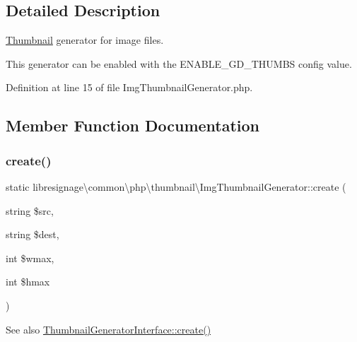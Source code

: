 \subsection{Detailed Description}
\hyperlink{classlibresignage_1_1common_1_1php_1_1thumbnail_1_1Thumbnail}{Thumbnail} generator for image files.


\begin{DoxyItemize}
\item This generator can be enabled with the E\+N\+A\+B\+L\+E\+\_\+\+G\+D\+\_\+\+T\+H\+U\+M\+BS config value. 
\end{DoxyItemize}

Definition at line 15 of file Img\+Thumbnail\+Generator.\+php.



\subsection{Member Function Documentation}
\mbox{\label{classlibresignage_1_1common_1_1php_1_1thumbnail_1_1ImgThumbnailGenerator_aa988f6ec383e43ddf2d1c017e1a0af4f}} 
\subsubsection{\texorpdfstring{create()}{create()}}
{\footnotesize\ttfamily static libresignage\textbackslash{}common\textbackslash{}php\textbackslash{}thumbnail\textbackslash{}\+Img\+Thumbnail\+Generator\+::create (\begin{DoxyParamCaption}\item[{string}]{\$src,  }\item[{string}]{\$dest,  }\item[{int}]{\$wmax,  }\item[{int}]{\$hmax }\end{DoxyParamCaption})\hspace{0.3cm}{\ttfamily [static]}}

\begin{DoxySeeAlso}{See also}
\hyperlink{interfacelibresignage_1_1common_1_1php_1_1thumbnail_1_1ThumbnailGeneratorInterface_ac4301d4bc3ac1011243a81a9ad8c68d5}{Thumbnail\+Generator\+Interface\+::create()} 
\end{DoxySeeAlso}



